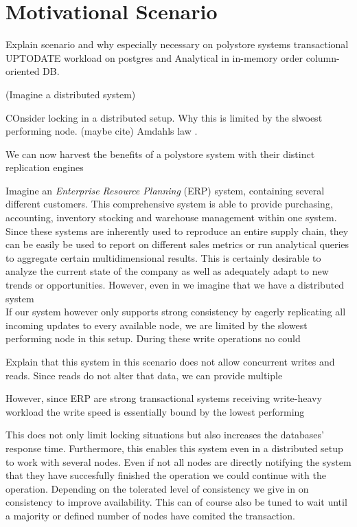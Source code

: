 \chapter{Motivational Scenario}
\label{c:motivation}

Explain scenario and why especially necessary on polystore systems
transactional UPTODATE workload on postgres and 
Analytical in in-memory order column-oriented DB. 

(Imagine a distributed system)

COnsider locking in a distributed setup. Why this is limited by the slwoest performing node.
(maybe cite) Amdahls law .

We can now harvest the benefits of a polystore system with their distinct replication engines

Imagine an \emph{Enterprise Resource Planning} (ERP) system, containing several different customers.
This comprehensive system is able to provide purchasing, accounting, inventory stocking and warehouse management within one system.
Since these systems are inherently used to reproduce an entire supply chain, they can be easily be used to report on different sales metrics
or run analytical queries to aggregate certain multidimensional results. This is certainly desirable to analyze the current state of the company as well as adequately adapt 
to new trends or opportunities. However, even in we imagine that we have a distributed system \\
If our system however only supports strong consistency by eagerly replicating all incoming updates to every available node, 
we are limited by the slowest performing node in this setup. During these write operations no could

Explain that this system in this scenario does not allow concurrent writes and reads. Since reads do not alter that data, we can provide multiple 




However, since ERP  are strong transactional systems receiving write-heavy workload the write speed is essentially bound by the lowest performing

This does not only limit locking situations but also increases the databases' response time. Furthermore, this enables this system even in a distributed setup to work 
with several nodes. Even if not all nodes are directly notifying the system that they have succesfully finished the operation we could continue with the operation.
Depending on the tolerated level of consistency we give in on consistency to improve availability. This can of course also be tuned to wait until a majority or defined number of nodes 
have comited the transaction.